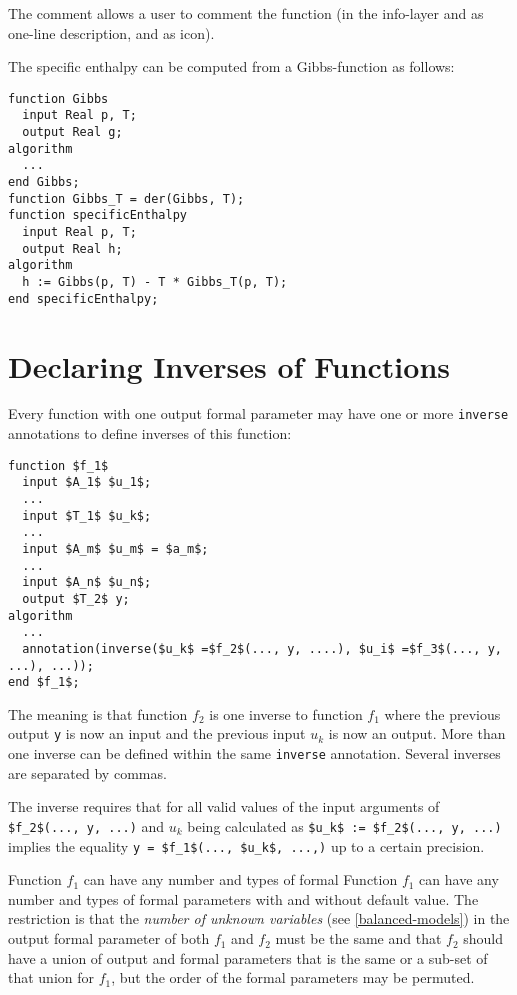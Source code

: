 The comment allows a user to comment the function (in the info-layer and as one-line description, and as icon).

\begin{example}
The specific enthalpy can be computed from a Gibbs-function as follows:
\begin{lstlisting}[language=modelica]
function Gibbs
  input Real p, T;
  output Real g;
algorithm
  ...
end Gibbs;
function Gibbs_T = der(Gibbs, T);
function specificEnthalpy
  input Real p, T;
  output Real h;
algorithm
  h := Gibbs(p, T) - T * Gibbs_T(p, T);
end specificEnthalpy;
\end{lstlisting}
\end{example}

\section{Declaring Inverses of Functions}\label{declaring-inverses-of-functions}

Every function with one output formal parameter may have one or more
\lstinline!inverse! annotations to define inverses of this function:
\begin{lstlisting}[language=modelica]
function $f_1$
  input $A_1$ $u_1$;
  ...
  input $T_1$ $u_k$;
  ...
  input $A_m$ $u_m$ = $a_m$;
  ...
  input $A_n$ $u_n$;
  output $T_2$ y;
algorithm
  ...
  annotation(inverse($u_k$ =$f_2$(..., y, ....), $u_i$ =$f_3$(..., y, ...), ...));
end $f_1$;
\end{lstlisting}

The meaning is that function $f_2$ is one inverse to function $f_1$ where the previous output \lstinline!y! is now an input and the previous input $u_k$ is now an output.  More than one inverse can be defined within the same \lstinline!inverse! annotation.  Several inverses are separated by commas.

\begin{nonnormative}
The inverse requires that for all valid values of the input arguments of \lstinline!$f_2$(..., y, ...)! and $u_k$ being calculated as \lstinline!$u_k$ := $f_2$(..., y, ...)! implies
the equality \lstinline!y = $f_1$(..., $u_k$, ...,)! up to a certain precision.
\end{nonnormative}

Function $f_1$ can have any number and types of formal
Function $f_1$ can have any number and types of formal
parameters with and without default value. The restriction is that the
\emph{number of unknown variables} (see \cref{balanced-models}) in the output formal
parameter of both $f_1$ and $f_2$ must be
the same and that $f_2$ should have a union of output and formal
parameters that is the same or a sub-set of that union for $f_1$, but the order of the formal
parameters may be permuted.


